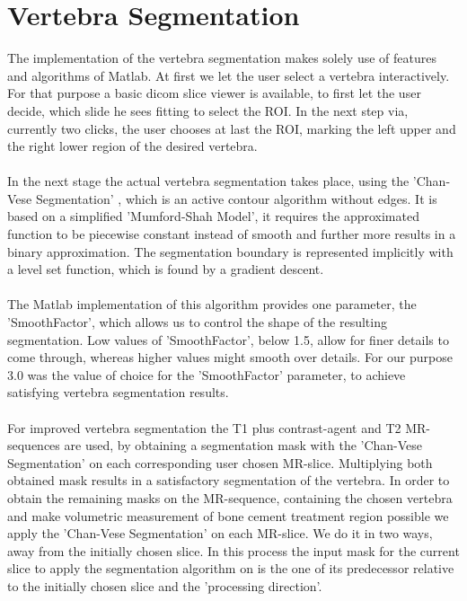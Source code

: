 \documentclass{article}
\begin{document}
  \section{Vertebra Segmentation}
  {
    The implementation of the vertebra segmentation makes solely use of features and algorithms
    of Matlab. At first we let the user select a vertebra interactively. For that purpose a basic 
    dicom slice viewer is available, to first let the user decide, which slide he sees fitting to select the ROI. In the next step via, currently two clicks, the user chooses at last the ROI, marking the left upper and the right lower region of the desired vertebra.\\
    \\In the next stage the actual vertebra segmentation takes place, using the 'Chan-Vese Segmentation' \cite{[ChanVese01]}, which is an active contour algorithm without edges. It is based on a simplified 'Mumford-Shah Model', it requires the approximated function to be piecewise constant instead of smooth and further more results in a binary approximation. The segmentation boundary is represented implicitly with a level set function, which is found by a gradient descent. \\
    \\ The Matlab implementation of this algorithm provides one parameter, the 'SmoothFactor', which allows us to control the shape of the resulting segmentation.
    Low values of 'SmoothFactor', below 1.5, allow for finer details to come through, whereas higher values might smooth over details. For our purpose 3.0 was the value of choice for the 'SmoothFactor' parameter, to achieve satisfying vertebra segmentation results.\\
    \\For improved vertebra segmentation the T1 plus contrast-agent and T2 MR-sequences are used, by obtaining a segmentation mask with the 'Chan-Vese Segmentation' \cite{[ChanVese01]} on each corresponding user chosen MR-slice. Multiplying both obtained mask results in a satisfactory segmentation of the vertebra.  
    In order to obtain the remaining masks on the MR-sequence, containing the chosen vertebra and make volumetric measurement of bone cement treatment region possible we apply the 'Chan-Vese Segmentation' \cite{[ChanVese01]} on each MR-slice. \newline 
    We do it in two ways, away from the initially chosen slice. In this process the input mask for the current slice to apply the segmentation algorithm on is the one of its predecessor relative to the initially chosen slice and the 'processing direction'.
}
\end{document}
